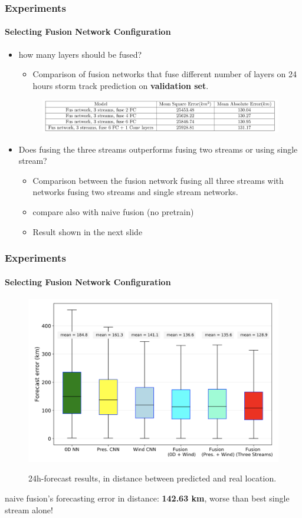\documentclass{beamer}
\begin{document}
\begin{frame}
\frametitle{Experiments}
\framesubtitle{Selecting Fusion Network Configuration}
\begin{itemize}
	\item  how many layers should be fused?
	\begin{itemize}
		\item Comparison of fusion networks that fuse different number of layers on 24 hours storm track prediction on \textbf{validation set}.
		
	\end{itemize}
	\begin{figure}
		\includegraphics[width=0.95\linewidth]{figs/fusion_1.png} \\
	\end{figure}
	\item  Does fusing the three streams outperforms fusing two streams or using single stream?
	\begin{itemize}
		\item Comparison between the fusion network fusing all three streams with networks fusing two streams and single stream networks.
		\item compare also with naive fusion (no pretrain)
		\item Result shown in the next slide
		
	\end{itemize}
\end{itemize}
\end{frame}

\begin{frame}
\frametitle{Experiments}
\framesubtitle{Selecting Fusion Network Configuration}
\begin{figure}
	\caption{24h-forecast results, in distance between predicted and real location.}
	\includegraphics[width=0.68\linewidth]{figs/MAE.PNG} \\
\end{figure}

\small{naive fusion's forecasting error in distance: \textbf{142.63 km}, worse than best single stream alone! }


\end{frame}
\end{document}
